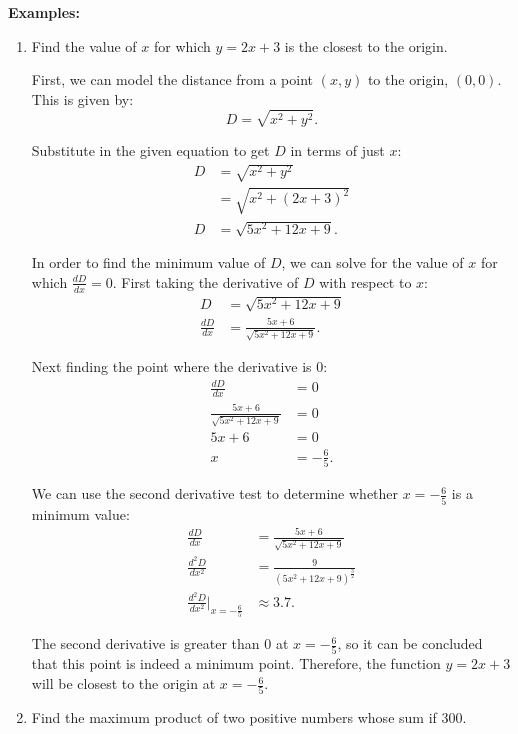 \documentclass[12pt]{article}
\begin{document}
\noindent \textbf{Examples:}
\begin{enumerate}
	\item Find the value of $x$ for which $y = 2x + 3$ is the closest to the origin.

	First, we can model the distance from a point $(x, y)$ to the origin, $(0, 0)$. This is given by:
	\[ D = \sqrt{x^2 + y^2}. \]

	Substitute in the given equation to get $D$ in terms of just $x$:
	\begin{align*}
		D &= \sqrt{x^2 + y^2} \\
		&= \sqrt{x^2 + (2x + 3)^2} \\
		D &= \sqrt{5x^2 + 12x + 9}.
	\end{align*}

	In order to find the minimum value of $D$, we can solve for the value of $x$ for which $\frac{dD}{dx} = 0$. First taking the derivative of $D$ with respect to $x$:
	\begin{align*}
		D &= \sqrt{5x^2 + 12x + 9} \\
		\frac{dD}{dx} &= \frac{5x + 6}{\sqrt{5x^2 + 12x + 9}}.
	\end{align*}

	Next finding the point where the derivative is $0$:
	\begin{align*}
		\frac{dD}{dx} &= 0 \\[5pt]
		\frac{5x + 6}{\sqrt{5x^2 + 12x + 9}} &= 0 \\[5pt]
		5x + 6 &= 0 \\
		x &= -\frac{6}{5}.
	\end{align*}

	We can use the second derivative test to determine whether $x = -\frac{6}{5}$ is a minimum value:
	\begin{align*}
		\frac{dD}{dx} &= \frac{5x + 6}{\sqrt{5x^2 + 12x + 9}} \\[5pt]
		\frac{d^2 D}{dx^2} &= \frac{9}{\left( 5x^2 + 12x + 9 \right)^{\frac{3}{2}}} \\[5pt]
		\frac{d^2 D}{dx^2} \Big|_{x = -\frac{6}{5}} &\approx 3.7.
	\end{align*}

	The second derivative is greater than $0$ at $x = -\frac{6}{5}$, so it can be concluded that this point is indeed a minimum point. Therefore, the function $y = 2x + 3$ will be closest to the origin at $x = -\frac{6}{5}$.

	\item Find the maximum product of two positive numbers whose sum if $300$.


\end{enumerate}
\end{document}
